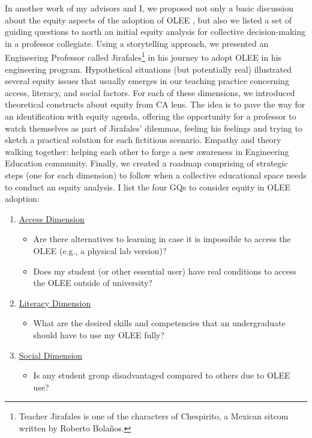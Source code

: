 In another work of my advisors and I, we proposed not only a basic discussion about the equity aspects of the adoption of \acrfull{OLEE} \cite{bispojr:2024-online-lab}, but also we listed a set of guiding questions to north an initial equity analysis for collective decision-making in a professor collegiate. Using a storytelling approach, we presented an Engineering Professor called Jirafales\footnote{Teacher Jirafales is one of the characters of Chespirito, a Mexican sitcom written by Roberto Bolaños.} in his journey to adopt \gls{OLEE} in his engineering program. Hypothetical situations (but potentially real) illustrated several equity issues that usually emerges in our teaching practice concerning access, literacy, and social factors. For each of these dimensions, we introduced theoretical constructs about equity from \gls{CA} lens. The idea is to pave the way for an identification with equity agenda, offering the opportunity for a professor to watch themselves as part of Jirafales' dilemmas, feeling his feelings and trying to sketch a practical solution for each fictitious scenario. Empathy and theory walking together: helping each other to forge a new awareness in Engineering Education community. Finally, we created a roadmap comprising of strategic steps (one for each dimension) to follow when a collective educational space needs to conduct an equity analysis. I list the four \glspl{GQ} to consider equity in \gls{OLEE} adoption:
\begin{enumerate}
    \item \underline{Access Dimension}
    \begin{itemize}
        \item[(\gls{GQ}1)] Are there alternatives to learning in case it is impossible to access the OLEE (e.g., a physical lab version)?
        \item[(\gls{GQ}2)] Does my student (or other essential user) have real conditions to access the OLEE outside of university?
    \end{itemize} 
    \item \underline{Literacy Dimension}
    \begin{itemize}
        \item[(\gls{GQ}3)] What are the desired skills and competencies that an undergraduate should have to use my OLEE fully?
    \end{itemize}
    \item \underline{Social Dimension}
    \begin{itemize}
        \item[(\gls{GQ}4)] Is any student group disadvantaged compared to others due to OLEE use?
    \end{itemize}
\end{enumerate} 

